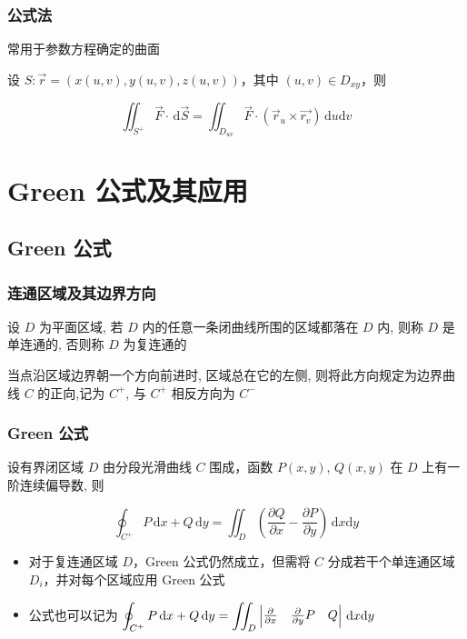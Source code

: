 \documentclass[lang = zh , final , oneside , openany , titlepage , zihao = -4 , linespread = 1.3 , baselineskip = false , cjk-font = windows , text-font = newtx , math-font = newtx]{sjtureport}
\begin{document}
\subsubsection{公式法}

常用于参数方程确定的曲面

设 \(S:\vec{r} = \left(x(u,v),y(u,v),z(u,v)\right)\)，其中
\((u,v)\in D_{xy}\)，则

\[\iint_{S^+}\vec{F}\cdot\,\mathrm{d}\vec{S} = \iint_{D_{uv}}\vec{F}\cdot\left(\vec{r}_u\times\vec{r_v}\right)\,\mathrm{d}u\mathrm{d}v\]

\section{Green 公式及其应用}

\subsection{Green 公式}

\subsubsection{连通区域及其边界方向}

设 \(D\) 为平面区域, 若 \(D\) 内的任意一条闭曲线所围的区域都落在 \(D\)
内, 则称 \(D\) 是单连通的, 否则称 \(D\) 为复连通的

当点沿区域边界朝一个方向前进时, 区域总在它的左侧,
则将此方向规定为边界曲线 \(C\) 的正向,记为 \(C^+\), 与 \(C^+\)
相反方向为 \(C^-\)

\subsubsection{Green 公式}

\begin{theorem}
    设有界闭区域 \(D\) 由分段光滑曲线 \(C\) 围成，函数 \(P(x, y)\),
\(Q(x, y)\) 在 \(D\) 上有一阶连续偏导数, 则

\[\oint_{C^+} P\,\mathrm{d}x + Q\,\mathrm{d}y = \iint_D \left(\frac{\partial Q}{\partial x} - \frac{\partial P}{\partial y}\right)\,\mathrm{d}x\mathrm{d}y\]
\end{theorem}

\begin{itemize}
\item
  对于复连通区域 \(D\)，Green 公式仍然成立，但需将 \(C\)
  分成若干个单连通区域 \(D_i\)，并对每个区域应用 Green 公式
\item
  公式也可以记为
  \(\displaystyle\oint_{C^+} P\,\mathrm{d}x + Q\,\mathrm{d}y = \iint_D \begin{vmatrix}\frac{\partial}{\partial x}&\frac{\partial}{\partial y}\newline P&Q\end{vmatrix}\,\mathrm{d}x\mathrm{d}y\)
\end{itemize}
\end{document}
